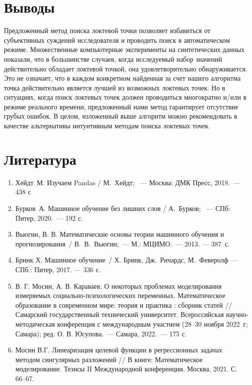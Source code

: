 \documentclass[a4paper,12pt]{article}
\begin{document}
\section{Выводы}

Предложенный метод поиска локтевой точки позволяет избавиться от субъективных суждений исследователя и проводить поиск в автоматическом режиме. Множественные компьютерные эксперименты на синтетических данных показали, что в большинстве случаев, когда исследуемый набор значений действительно обладает локтевой точкой, она удовлетворительно обнаруживается. Это не означает, что в каждом конкретном найденная за счет нашего алгоритма точка действительно является лучшей из возможных локтевых точек. Но в ситуациях, когда поиск локтевых точек должен проводиться многократно и/или в режиме реального времени, предложенный нами метод гарантирует отсутствие грубых ошибок. В целом, изложенный выше алгоритм можно рекомендовать в качестве альтернативы интуитивным методам поиска локтевых точек.

\section{Литература}

\begin{enumerate}
	\item Хейдт М. Изучаем Pandas / М. Хейдт;  — Москва: ДМК Пресс, 2018. — 438 с
	\item Бурков А. Машинное обучение без лишних слов / А. Бурков;  — СПб: Питер, 2020. — 192 с. 
	\item Вьюгин, В. В. Математические основы теории машинного обучения и прогнозирования / В. В. Вьюгин; — М.: МЦИМО. — 2013. — 387~с.
	\item Бринк Х. Машинное обучение / Х. Бринк, Дж. Ричардс, М. Феверолф  — СПб.: Питер, 2017. — 336 с.
	\item В. Г. Мосин, А. В. Караваев. О некоторых проблемах моделирования измеряемых социально-психологических переменных. Математическое образование в современном мире: теория и практика : сборник статей // Самарский государственный технический университет. Всероссийская научно-методическая конференция с международным участием (28–30 ноября 2022~г; Самара); ред. О. В. Юсупова.~--- Самара, 2022.~--- 175 с.
	\item Мосин В.Г. Линеаризация целевой функции в регрессионных задачах методом сингулярных разложений // В книге: Математическое моделирование. Тезисы II Международной конференции. Москва, 2021. С. 66--67.
\end{enumerate}
\end{document}
